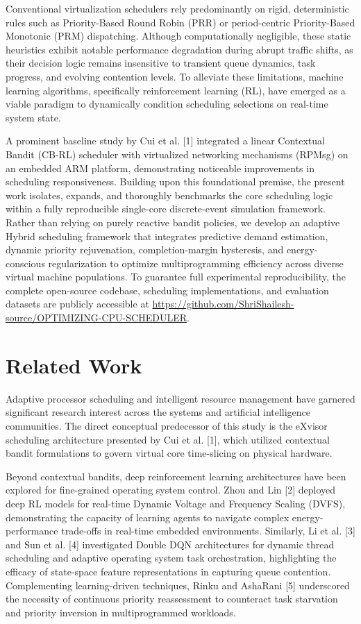 \documentclass[conference]{IEEEtran}
\begin{document}
Conventional virtualization schedulers rely predominantly on rigid, deterministic rules such as Priority-Based Round Robin (PRR) or period-centric Priority-Based Monotonic (PRM) dispatching. Although computationally negligible, these static heuristics exhibit notable performance degradation during abrupt traffic shifts, as their decision logic remains insensitive to transient queue dynamics, task progress, and evolving contention levels. To alleviate these limitations, machine learning algorithms, specifically reinforcement learning (RL), have emerged as a viable paradigm to dynamically condition scheduling selections on real-time system state.

A prominent baseline study by Cui et al. [1] integrated a linear Contextual Bandit (CB-RL) scheduler with virtualized networking mechanisms (RPMsg) on an embedded ARM platform, demonstrating noticeable improvements in scheduling responsiveness. Building upon this foundational premise, the present work isolates, expands, and thoroughly benchmarks the core scheduling logic within a fully reproducible single-core discrete-event simulation framework. Rather than relying on purely reactive bandit policies, we develop an adaptive Hybrid scheduling framework that integrates predictive demand estimation, dynamic priority rejuvenation, completion-margin hysteresis, and energy-conscious regularization to optimize multiprogramming efficiency across diverse virtual machine populations. To guarantee full experimental reproducibility, the complete open-source codebase, scheduling implementations, and evaluation datasets are publicly accessible at \url{https://github.com/ShriShailesh-source/OPTIMIZING-CPU-SCHEDULER}.

\section{Related Work}
Adaptive processor scheduling and intelligent resource management have garnered significant research interest across the systems and artificial intelligence communities. The direct conceptual predecessor of this study is the eXvisor scheduling architecture presented by Cui et al. [1], which utilized contextual bandit formulations to govern virtual core time-slicing on physical hardware.

Beyond contextual bandits, deep reinforcement learning architectures have been explored for fine-grained operating system control. Zhou and Lin [2] deployed deep RL models for real-time Dynamic Voltage and Frequency Scaling (DVFS), demonstrating the capacity of learning agents to navigate complex energy-performance trade-offs in real-time embedded environments. Similarly, Li et al. [3] and Sun et al. [4] investigated Double DQN architectures for dynamic thread scheduling and adaptive operating system task orchestration, highlighting the efficacy of state-space feature representations in capturing queue contention. Complementing learning-driven techniques, Rinku and AshaRani [5] underscored the necessity of continuous priority reassessment to counteract task starvation and priority inversion in multiprogrammed workloads.
\end{document}
